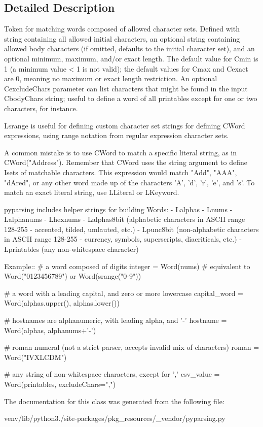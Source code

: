 \subsection{Detailed Description}
\begin{DoxyVerb}Token for matching words composed of allowed character sets.
Defined with string containing all allowed initial characters,
an optional string containing allowed body characters (if omitted,
defaults to the initial character set), and an optional minimum,
maximum, and/or exact length.  The default value for C{min} is 1 (a
minimum value < 1 is not valid); the default values for C{max} and C{exact}
are 0, meaning no maximum or exact length restriction. An optional
C{excludeChars} parameter can list characters that might be found in 
the input C{bodyChars} string; useful to define a word of all printables
except for one or two characters, for instance.

L{srange} is useful for defining custom character set strings for defining 
C{Word} expressions, using range notation from regular expression character sets.

A common mistake is to use C{Word} to match a specific literal string, as in 
C{Word("Address")}. Remember that C{Word} uses the string argument to define
I{sets} of matchable characters. This expression would match "Add", "AAA",
"dAred", or any other word made up of the characters 'A', 'd', 'r', 'e', and 's'.
To match an exact literal string, use L{Literal} or L{Keyword}.

pyparsing includes helper strings for building Words:
 - L{alphas}
 - L{nums}
 - L{alphanums}
 - L{hexnums}
 - L{alphas8bit} (alphabetic characters in ASCII range 128-255 - accented, tilded, umlauted, etc.)
 - L{punc8bit} (non-alphabetic characters in ASCII range 128-255 - currency, symbols, superscripts, diacriticals, etc.)
 - L{printables} (any non-whitespace character)

Example::
    # a word composed of digits
    integer = Word(nums) # equivalent to Word("0123456789") or Word(srange("0-9"))
    
    # a word with a leading capital, and zero or more lowercase
    capital_word = Word(alphas.upper(), alphas.lower())

    # hostnames are alphanumeric, with leading alpha, and '-'
    hostname = Word(alphas, alphanums+'-')
    
    # roman numeral (not a strict parser, accepts invalid mix of characters)
    roman = Word("IVXLCDM")
    
    # any string of non-whitespace characters, except for ','
    csv_value = Word(printables, excludeChars=",")
\end{DoxyVerb}
 

The documentation for this class was generated from the following file\+:\begin{DoxyCompactItemize}
\item 
venv/lib/python3./site-\/packages/pkg\+\_\+resources/\+\_\+vendor/pyparsing.\+py\end{DoxyCompactItemize}
